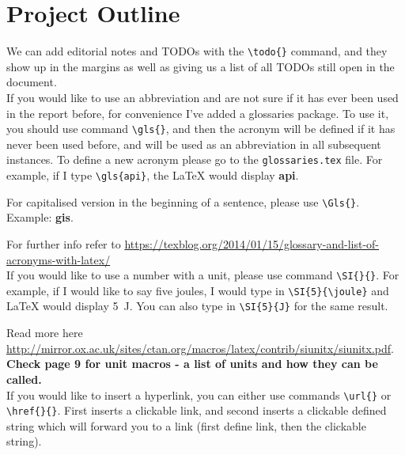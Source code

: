\documentclass[11pt,a4paper,fleqn, oneside]{book} %
\begin{document}


\chapter{Project Outline}
    \setcounter{page}{4}

\iffalse %
We can add editorial notes and TODOs with the \texttt{\textbackslash{}todo\{\}} command, and they show up in the margins as well as giving us a list of all TODOs still open in the document.\\

If you would like to use an abbreviation and are not sure if it has ever been used in the report before, for convenience I've added a glossaries package. To use it, you should use command \texttt{\textbackslash{}gls\{\}}, and then the acronym will be defined if it has never been used before, and will be used as an abbreviation in all subsequent instances. To define a new acronym please go to the \texttt{glossaries.tex} file. For example, if I type \texttt{\textbackslash{}gls\{api\}}, the LaTeX would display \textbf{\gls{api}}.

For capitalised version in the beginning of a sentence, please use \texttt{\textbackslash{}Gls\{\}}. Example: \textbf{\Gls{gis}}.

For further info refer to \url{https://texblog.org/2014/01/15/glossary-and-list-of-acronyms-with-latex/}\\

If you would like to use a number with a unit, please use command \texttt{\textbackslash{}SI\{\}\{\}}. For example, if I would like to say five joules, I would type in \texttt{\textbackslash{}SI\{5\}\{\textbackslash joule\}} and LaTeX would display \SI{5}{\joule}. You can also type in \texttt{\textbackslash{}SI\{5\}\{J\}} for the same result.

Read more here \url{http://mirror.ox.ac.uk/sites/ctan.org/macros/latex/contrib/siunitx/siunitx.pdf}.
\textbf{Check page 9 for unit macros - a list of units and how they can be called.}\\

If you would like to insert a hyperlink, you can either use commands \texttt{\textbackslash{}url\{\}} or \texttt{\textbackslash{}href\{\}\{\}}. First inserts a clickable link, and second inserts a clickable defined string which will forward you to a link (first define link, then the clickable string).
\end{document}
